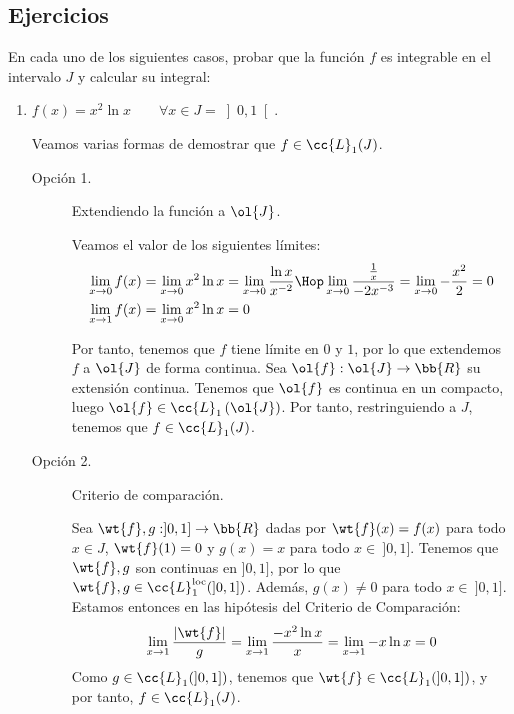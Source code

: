 \newpage
\subsection{Ejercicios}
\begin{ejercicio}
    En cada uno de los siguientes casos, probar que la función $f$ es integrable en el intervalo $J$ y calcular su integral:
    \begin{enumerate}
        \item $f(x)=x^2\ln x \qquad \forall x\in J=\left]0,1\right[$.
        
        Veamos varias formas de demostrar que $f\in \cc{L}_1(J)$.
        \begin{description}
            \item[Opción 1.] Extendiendo la función a $\ol{J}$.
            
            Veamos el valor de los siguientes límites:
            \begin{align*}
                \lim_{x\to 0} f(x) &= \lim_{x\to 0} x^2\ln x = \lim_{x\to 0} \dfrac{\ln x}{x^{-2}} \Hop \lim_{x\to 0} \dfrac{\frac{1}{x}}{-2x^{-3}} = \lim_{x\to 0} -\dfrac{x^2}{2} = 0\\
                \lim_{x\to 1} f(x) &= \lim_{x\to 0} x^2\ln x = 0
            \end{align*}

            Por tanto, tenemos que $f$ tiene límite en $0$ y $1$, por lo que extendemos $f$ a $\ol{J}$ de forma continua.
            Sea $\ol{f}:\ol{J}\to \bb{R}$ su extensión continua. Tenemos que $\ol{f}$ es continua en un compacto,
            luego $\ol{f}\in \cc{L}_1\left(\ol{J}\right)$. Por tanto, restringuiendo a $J$, tenemos que $f\in \cc{L}_1(J)$.

            \item[Opción 2.] Criterio de comparación.
            
            Sea $\wt{f},g:]0,1] \to \bb{R}$ dadas por $\wt{f}(x)=f(x)$ para todo $x\in J$, $\wt{f}(1)=0$ y $g(x)=x$ para todo $x\in~]0,1]$. Tenemos que
            $\wt{f},g$ son continuas en $]0,1]$, por lo que $\wt{f},g\in \cc{L}^{\text{loc}}_1(]0,1])$. Además, $g(x)\neq 0$ para todo $x\in~]0,1]$. Estamos entonces en las hipótesis del Criterio de Comparación:
            \begin{equation*}
                \lim_{x\to 1} \dfrac{|\wt{f}|}{g}
                = \lim_{x\to 1} \dfrac{-x^2\ln x}{x}
                = \lim_{x\to 1} -x\ln x = 0
            \end{equation*}
            Como $g\in \cc{L}_1(]0,1])$, tenemos que $\wt{f}\in \cc{L}_1(]0,1])$, y por tanto, $f\in \cc{L}_1(J)$.
        \end{description}
        

\end{enumerate}
\end{ejercicio}
